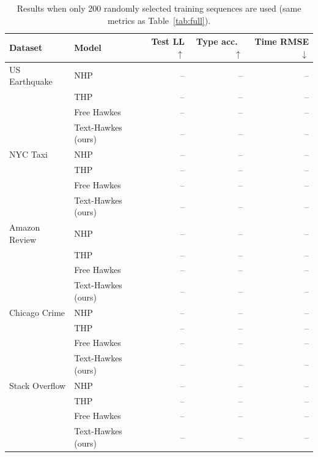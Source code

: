 \begin{table}[t]
\centering
\caption{Results when only 200 randomly selected training sequences are used (same metrics as Table~\ref{tab:full}).}
\label{tab:small}
\small
\begin{tabular}{llrrr}
\toprule
Dataset & Model & Test LL $\uparrow$ & Type acc.\ $\uparrow$ & Time RMSE $\downarrow$ \\
\midrule
US Earthquake & NHP & -- & -- & -- \\
 & THP & -- & -- & -- \\
 & Free Hawkes & -- & -- & -- \\
 & Text-Hawkes (ours) & -- & -- & -- \\
\midrule
NYC Taxi & NHP & -- & -- & -- \\
 & THP & -- & -- & -- \\
 & Free Hawkes & -- & -- & -- \\
 & Text-Hawkes (ours) & -- & -- & -- \\
\midrule
Amazon Review & NHP & -- & -- & -- \\
 & THP & -- & -- & -- \\
 & Free Hawkes & -- & -- & -- \\
 & Text-Hawkes (ours) & -- & -- & -- \\
\midrule
Chicago Crime & NHP & -- & -- & -- \\
 & THP & -- & -- & -- \\
 & Free Hawkes & -- & -- & -- \\
 & Text-Hawkes (ours) & -- & -- & -- \\
\midrule
Stack Overflow & NHP & -- & -- & -- \\
 & THP & -- & -- & -- \\
 & Free Hawkes & -- & -- & -- \\
 & Text-Hawkes (ours) & -- & -- & -- \\
\bottomrule
\end{tabular}
\end{table}